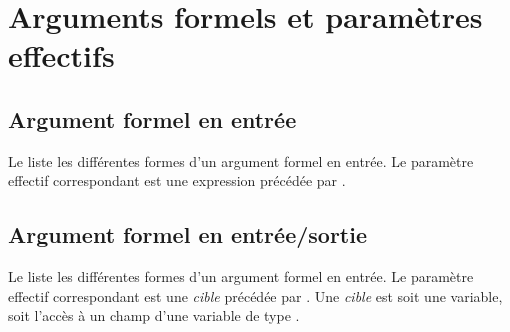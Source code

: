 \section{Arguments formels et paramètres effectifs}

\subsection{Argument formel en entrée}

Le  liste les différentes formes d'un argument formel en entrée. Le paramètre effectif correspondant est une expression précédée par \galgas{\!}.

\begin{table}[!ht]
  \centering
  \caption{Argument formel en entrée, paramètre effectif en sortie}
\end{table}

\subsection{Argument formel en entrée/sortie}

Le  liste les différentes formes d'un argument formel en entrée. Le paramètre effectif correspondant est une \emph{cible} précédée par \galgas{\!\?}. Une \emph{cible} est soit une variable, soit l'accès à un champ d'une variable de type .

